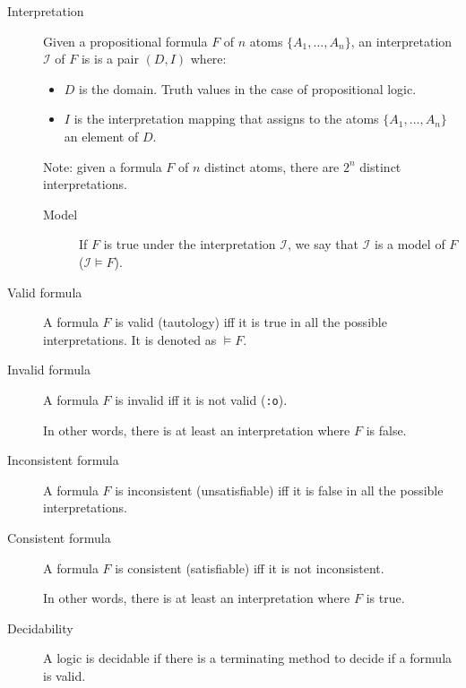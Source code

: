 \begin{description}
    \item[Interpretation] 
        Given a propositional formula $F$ of $n$ atoms $ \{ A_1, \dots, A_n \}$,
        an interpretation $\mathcal{I}$ of $F$ is is a pair $(D, I)$ where:
        \begin{itemize}
            \item $D$ is the domain. Truth values in the case of propositional logic.
            \item $I$ is the interpretation mapping that assigns
                to the atoms $\{ A_1, \dots, A_n \}$ an element of $D$.
        \end{itemize}

        Note: given a formula $F$ of $n$ distinct atoms, there are $2^n$ distinct interpretations.

        \begin{description}
            \item[Model] 
                If $F$ is true under the interpretation $\mathcal{I}$, 
                we say that $\mathcal{I}$ is a model of $F$ ($\mathcal{I} \models F$).
        \end{description}

    \item[Valid formula] 
        A formula $F$ is valid (tautology) iff it is true in all the possible interpretations.
        It is denoted as $\models F$.

    \item[Invalid formula] 
        A formula $F$ is invalid iff it is not valid {\tiny(\texttt{:o})}.
        
        In other words, there is at least an interpretation where $F$ is false.

    \item[Inconsistent formula] 
        A formula $F$ is inconsistent (unsatisfiable) iff it is false in all the possible interpretations.
    
    \item[Consistent formula] 
        A formula $F$ is consistent (satisfiable) iff it is not inconsistent.

        In other words, there is at least an interpretation where $F$ is true.

    \item[Decidability] 
        A logic is decidable if there is a terminating method to decide if a formula is valid.


\end{description}
